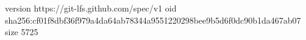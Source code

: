 version https://git-lfs.github.com/spec/v1
oid sha256:cf01f8dbf36f979a4da64ab78344a9551220298bee9b5d6f0dc90b1da467ab07
size 5725
